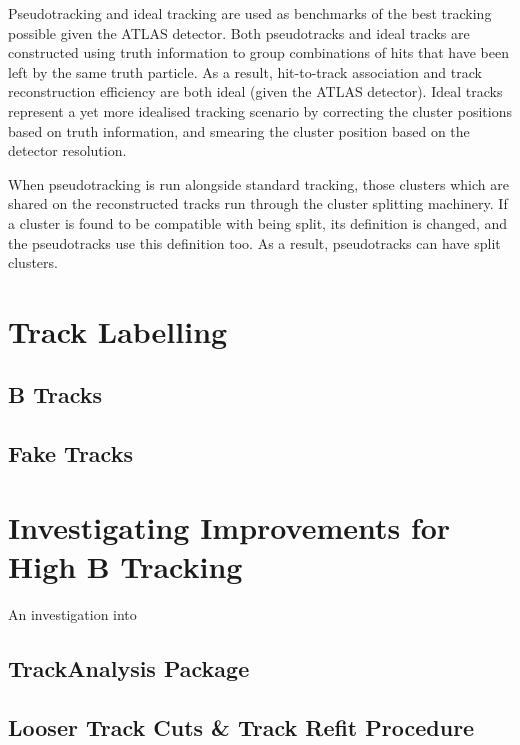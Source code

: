 Pseudotracking and ideal tracking are used as benchmarks of the best tracking possible given the ATLAS detector. Both pseudotracks and ideal tracks are constructed using truth information to group combinations of hits that have been left by the same truth particle. As a result, hit-to-track association and track reconstruction efficiency are both ideal (given the ATLAS detector). Ideal tracks represent a yet more idealised tracking scenario by correcting the cluster positions based on truth information, and smearing the cluster position based on the detector resolution.

When pseudotracking is run alongside standard tracking, those clusters which are shared on the reconstructed tracks run through the cluster splitting machinery. If a cluster is found to be compatible with being split, its definition is changed, and the pseudotracks use this definition too. As a result, pseudotracks can have split clusters.


\section{Track Labelling}\label{sec:track labelling}

\subsection{B Tracks}\label{sec:B track labelling}
\subsection{Fake Tracks}\label{sec:fake track labelling}

\section{Investigating Improvements for High \texorpdfstring{\pT}{pT} B Tracking}\label{sec:investigating tracking improvements}

An investigation into

\subsection{TrackAnalysis Package}\label{sec:track analysis package}


\subsection{Looser Track Cuts \& Track Refit Procedure}\label{sec:bcut and refit}

